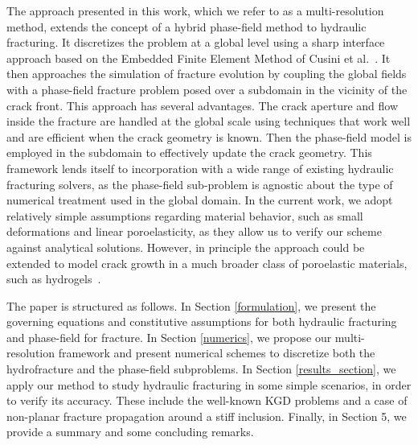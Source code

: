 The approach presented in this work, which we refer to as a multi-resolution method, extends the concept of a hybrid phase-field method to hydraulic fracturing. It discretizes the problem at a global level using a sharp interface approach based on the Embedded Finite Element Method of  Cusini et al.\ \cite{cusini2021simulation}.  It then approaches the simulation of fracture evolution by coupling the global fields with a phase-field fracture problem posed over a subdomain in the vicinity of the crack front.  This approach has several advantages.  The crack aperture and flow inside the fracture are handled at the global scale using techniques that work well and are efficient when the crack geometry is known.  Then the phase-field model is employed in the subdomain  to effectively update the crack geometry.  This framework lends itself to incorporation with a wide range of existing hydraulic fracturing solvers, as the phase-field sub-problem is agnostic about the type of numerical treatment used in the global domain. 
In the current work, we adopt relatively simple assumptions regarding material behavior, such as small deformations and linear poroelasticity, as they allow us to verify our scheme against analytical solutions. However, in principle the approach could be extended to model crack growth in a much broader class of poroelastic materials, such as hydrogels~\cite{Oyen:jop2021}. 

The paper is structured as follows. In Section \ref{formulation}, we present the governing equations and constitutive assumptions for both hydraulic fracturing and phase-field for fracture. In Section \ref{numerics}, we propose our multi-resolution framework and present numerical schemes to discretize both the hydrofracture and the phase-field subproblems. In Section \ref{results_section}, we apply our method to study hydraulic fracturing in some simple scenarios, in order to verify its accuracy. These include the well-known KGD\cite{geertsma1969rapid, zheltov19553} problems and a case of non-planar fracture propagation around a stiff inclusion. Finally, in Section 5, we provide a summary and some concluding remarks.


